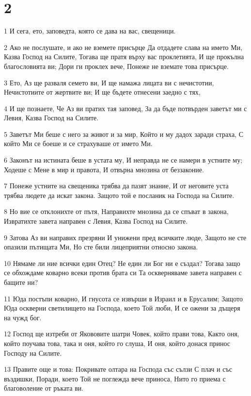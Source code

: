 \chapter{2}

\par 1 И сега, ето, заповедта, която се дава на вас, свещеници.
\par 2 Ако не послушате, и ако не вземете присърце Да отдадете слава на името Ми, Казва Господ на Силите, Тогава ще пратя върху вас проклетията, И ще прокълна благословията ви; Дори ги проклех вече, Понеже не вземате това присърце.
\par 3 Ето, Аз ще разваля семето ви, И ще намажа лицата ви с нечистотии, Нечистотиите от жертвите ви; И ще бъдете отнесени заедно с тях,
\par 4 И ще познаете, Че Аз ви пратих тая заповед, За да бъде потвърден заветът ми с Левия, Казва Господ на Силите.
\par 5 Заветът Ми беше с него за живот и за мир, Който и му дадох заради страха, С който Ми се боеше и се страхуваше от името Ми.
\par 6 Законът на истината беше в устата му, И неправда не се намери в устните му; Ходеше с Мене в мир и правота, И отвърна мнозина от беззаконие.
\par 7 Понеже устните на свещеника трябва да пазят знание, И от неговите уста трябва людете да искат закона. Защото той е посланик на Господа на Силите.
\par 8 Но вие се отклонихте от пътя, Направихте мнозина да се спъват в закона, Извратихте завета направен с Левия, Казва Господ на Силите.
\par 9 Затова Аз ви направих презряни И унижени пред всичките люде, Защото не сте опазили пътищата Ми, Но сте били лицеприятни относно закона.
\par 10 Нямаме ли ние всички един Отец? Не един ли Бог ни е създал? Тогава защо се обхождаме коварно всеки против брата си Та оскверняваме завета направен с бащите ни?
\par 11 Юда постъпи коварно, И гнусота се извърши в Израил и в Ерусалим; Защото Юда оскверни светилището на Господа, което Той люби, И се ожени за дъщеря на чужд бог.
\par 12 Господ ще изтреби от Якововите шатри Човек, който прави това, Както оня, който поучава това, така и оня, който го слуша, И оня, който донася принос Господу на Силите.
\par 13 Правите още и това: Покривате олтара на Господа със сълзи С плач и със въздишки, Поради, което Той не поглежда вече приноса, Нито го приема с благоволение от ръката ви.
